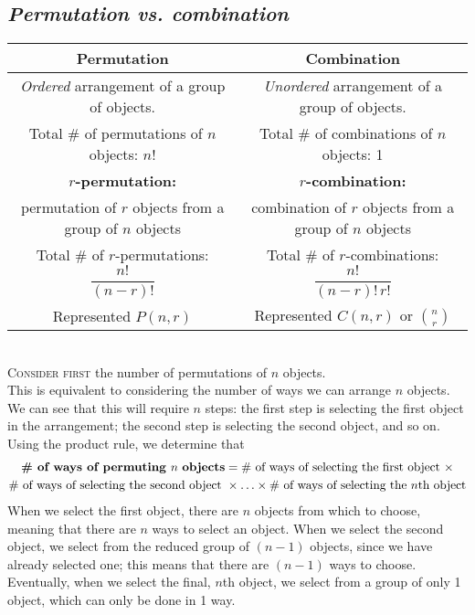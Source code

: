 \documentclass{article}
\begin{document}
\subsection{\em Permutation vs. combination}
\begin{tabular}{c|c}
{\bf Permutation}&{\bf Combination}\\[0.5ex]\hline\hline\noalign{\smallskip}
\textit{Ordered} arrangement of a group of objects.& \textit{Unordered} arrangement of a group of objects.\\[0.5ex]\hline\noalign{\smallskip}
Total \# of permutations of $n$ objects: $n!$&Total \# of combinations of $n$ objects: 1\\[0.5ex]\hline\noalign{\smallskip}
{\bf $r$-permutation:}&{\bf $r$-combination:}\\
permutation of $r$ objects from a group of $n$ objects&combination of $r$ objects from a group of $n$ objects\\[1ex]
Total \# of $r$-permutations: $\dfrac{n!}{(n-r)!}$&Total \# of $r$-combinations: $\dfrac{n!}{(n-r)!\,r!}$\\[0.5ex]\noalign{\smallskip}\hline\noalign{\smallskip}
Represented $P(n,r)$&Represented $C(n,r)$ or $\binom{n}{r}$
\end{tabular}\\[2ex]
\textsc{Consider first} the number of permutations of $n$ objects.\\[1ex]
This is equivalent to considering the number of ways we can arrange $n$ objects. We can see that this will require $n$ steps: the first step is selecting the first object in the arrangement; the second step is selecting the second object, and so on.\\[1ex]
Using the product rule, we determine that
\begin{multline*}
\text{\bf\# of ways of permuting }n\text{ \bf objects}=\text{\# of ways of selecting the first object }\times\\
\text{\# of ways of selecting the second object }\times\ldots\times\text{\# of ways of selecting the }n\text{th object}
\end{multline*}
When we select the first object, there are $n$ objects from which to choose, meaning that there are $n$ ways to select an object. When we select the second object, we select from the reduced group of $(n-1)$ objects, since we have already selected one; this means that there are $(n-1)$ ways to choose. Eventually, when we select the final, $n$th object, we select from a group of only 1 object, which can only be done in 1 way.\\[1ex]
\end{document}
